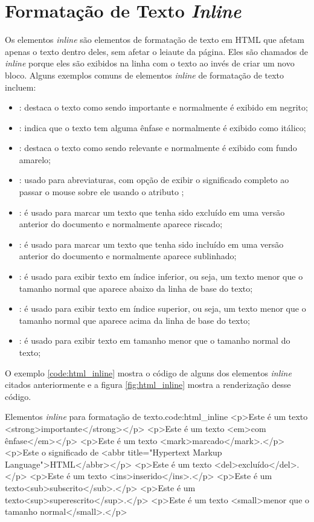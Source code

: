 \section{Formatação de Texto \textit{Inline}}

Os elementos \textit{inline} são elementos de formatação de texto em HTML que afetam apenas o texto dentro deles, sem afetar o leiaute da página. Eles são chamados de \textit{inline} porque eles são exibidos na linha com o texto ao invés de criar um novo bloco. Alguns exemplos comuns de elementos \textit{inline} de formatação de texto incluem:

\begin{itemize}
    \item {}: destaca o texto como sendo importante e normalmente é exibido em negrito;
    \item {}: indica que o texto tem alguma ênfase e normalmente é exibido como itálico;
    \item {}: destaca o texto como sendo relevante e normalmente é exibido com fundo amarelo;
    \item {}: usado para abreviaturas, com opção de exibir o significado completo ao passar o mouse sobre ele usando o atributo ;
    \item {}: é usado para marcar um texto que tenha sido excluído em uma versão anterior do documento e normalmente aparece riscado;
    \item {}: é usado para marcar um texto que tenha sido incluído em uma versão anterior do documento e normalmente aparece sublinhado;
    \item {}: é usado para exibir texto em índice inferior, ou seja, um texto menor que o tamanho normal que aparece abaixo da linha de base do texto;
    \item {}: é usado para exibir texto em índice superior, ou seja, um texto menor que o tamanho normal que aparece acima da linha de base do texto;
    \item {}: é usado para exibir texto em tamanho menor que o tamanho normal do texto;
\end{itemize}

O exemplo \ref{code:html_inline} mostra o código de alguns dos elementos \textit{inline} citados anteriormente e a figura \ref{fig:html_inline} mostra a renderização desse código.

\begin{htmlcode}{Elementos \textit{inline} para formatação de texto.}{code:html_inline}
<p>Este é um texto <strong>importante</strong></p>
<p>Este é um texto <em>com ênfase</em></p>
<p>Este é um texto <mark>marcado</mark>.</p>
<p>Este o significado de <abbr title="Hypertext Markup Language">HTML</abbr></p>
<p>Este é um texto <del>excluído</del>.</p>
<p>Este é um texto <ins>inserido</ins>.</p>
<p>Este é um texto<sub>subscrito</sub>.</p>
<p>Este é um texto<sup>superescrito</sup>.</p>
<p>Este é um texto <small>menor que o tamanho normal</small>.</p>
\end{htmlcode}

